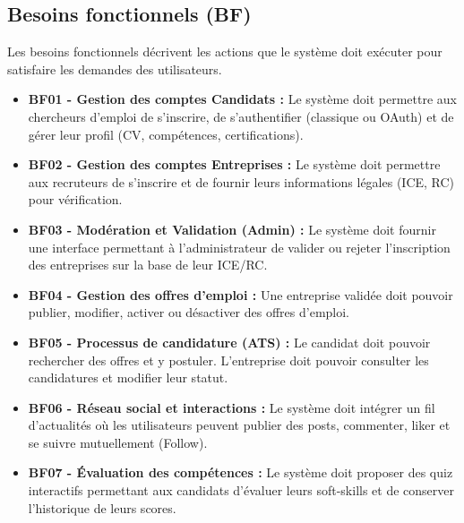 \subsection{Besoins fonctionnels (BF)}
Les besoins fonctionnels décrivent les actions que le système doit exécuter pour satisfaire les demandes des utilisateurs.
\begin{itemize}
    \item \textbf{BF01 - Gestion des comptes Candidats :} Le système doit permettre aux chercheurs d'emploi de s'inscrire, de s'authentifier (classique ou OAuth) et de gérer leur profil (CV, compétences, certifications).
    \item \textbf{BF02 - Gestion des comptes Entreprises :} Le système doit permettre aux recruteurs de s'inscrire et de fournir leurs informations légales (ICE, RC) pour vérification.
    \item \textbf{BF03 - Modération et Validation (Admin) :} Le système doit fournir une interface permettant à l'administrateur de valider ou rejeter l'inscription des entreprises sur la base de leur ICE/RC.
    \item \textbf{BF04 - Gestion des offres d'emploi :} Une entreprise validée doit pouvoir publier, modifier, activer ou désactiver des offres d'emploi.
    \item \textbf{BF05 - Processus de candidature (ATS) :} Le candidat doit pouvoir rechercher des offres et y postuler. L'entreprise doit pouvoir consulter les candidatures et modifier leur statut.
    \item \textbf{BF06 - Réseau social et interactions :} Le système doit intégrer un fil d'actualités où les utilisateurs peuvent publier des posts, commenter, liker et se suivre mutuellement (Follow).
    \item \textbf{BF07 - Évaluation des compétences :} Le système doit proposer des quiz interactifs permettant aux candidats d'évaluer leurs soft-skills et de conserver l'historique de leurs scores.
\end{itemize}

